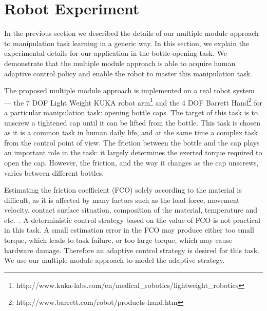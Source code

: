 \section{Robot Experiment}
\label{sec:exp}

In the previous section we described the details of our multiple
module approach to manipulation task learning in a generic way. In this section,
we explain the experimental details for our application in the
bottle-opening task.  We demonstrate that the multiple module approach
is able to acquire human adaptive control policy and enable the robot
to master this manipulation task.

The proposed multiple module approach is implemented on a real robot system
--- the 7 DOF Light Weight KUKA robot arm\footnote{http://www.kuka-labs.com/en/medical\_robotics/lightweight\_robotics} and the 4 DOF Barrett Hand\footnote{http://www.barrett.com/robot/products-hand.htm}
for a particular manipulation task: opening bottle caps. The target of
this task is to unscrew a tightened cap until it can be lifted from
the bottle. This task is chosen as it is a common task in human daily
life, and at the same time a
complex task from the control point of view. The friction between the
bottle and the cap plays an important role in the task: it largely
determines the exerted torque required to open the cap. However, the
friction, and the way it changes as the cap unscrews, varies
between different bottles.

Estimating the friction coefficient (FCO) solely according to the
material is difficult, as it is affected by many factors such as the
load force, movement velocity, contact surface situation, composition
of the material, temperature and
etc.~\citep{gustafssoninvestigation}. A deterministic control strategy
based on the value of FCO is not practical in this task. A small
estimation error in the FCO may produce either too small torque,
which leads to task failure, or too large torque, which may cause
hardware damage. Therefore an adaptive control strategy is desired for
this
task. %
We use our multiple module approach to model the adaptive strategy.


